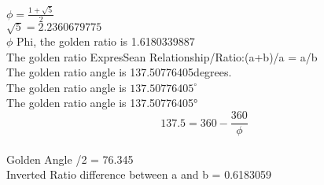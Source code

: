 \documentclass{article} %
\begin{document}
%
$\phi = \frac{1 + \sqrt{5}}{2}$
\\ %
$\sqrt{5}=2.2360679775$
\\
\newcommand{\goldenratio}{1.6180339887}
$\phi$ Phi, the golden ratio is \goldenratio
\\
The golden ratio ExpresSean Relationship/Ratio:(a+b)/a = a/b
\\
\newcommand{\goldenangle}{137.50776405}
The golden ratio angle is \goldenangle degrees.
\\
The golden ratio angle is \ensuremath{137.50776405^\circ}
\\
The golden ratio angle is \ang{137.50776405}
\\
\begin{equation}
    137.5 = 360 - \frac{360}{\phi}
\end{equation}
\\
Golden Angle /2 = 76.345
\\
Inverted Ratio difference between a and b = 0.6183059
\\
\end{document}
